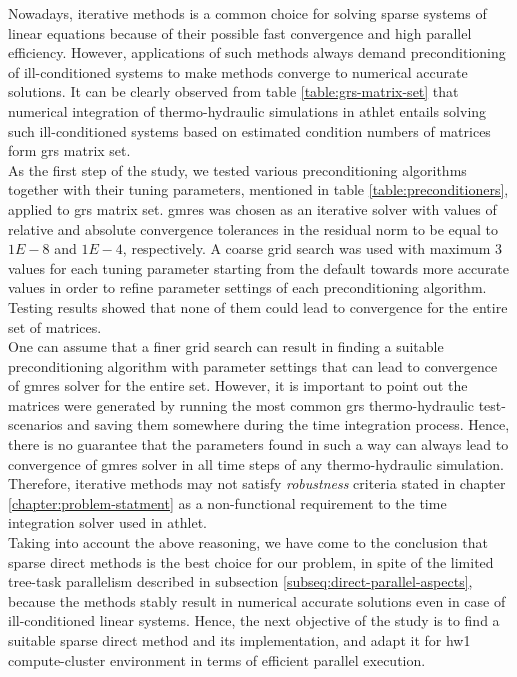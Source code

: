 \label{subseq:hybrid-method-description}

Nowadays, iterative methods is a common choice for solving sparse systems of linear equations because of their possible fast convergence and high parallel efficiency. However,  applications of such methods always demand preconditioning of ill-conditioned systems to make methods converge to numerical accurate solutions. It can be clearly observed from table \ref{table:grs-matrix-set} that numerical integration of thermo-hydraulic simulations in \acrshort{athlet} entails solving such ill-conditioned systems  based on estimated condition numbers of matrices form \acrshort{grs} matrix set.\\


As the first step of the study, we tested various preconditioning algorithms together with their tuning parameters, mentioned in table \ref{table:preconditioners}, applied to \acrshort{grs} matrix set. \acrshort{gmres} was chosen as an iterative solver with values of relative and absolute convergence tolerances in the residual norm to be equal to $1E-8$ and $1E-4$, respectively. A coarse grid search was used with maximum 3 values for each tuning parameter starting from the default towards more accurate values in order to refine parameter settings of each preconditioning algorithm. Testing results showed that none of them could lead to convergence for the entire set of matrices.\\


One can assume that a finer grid search can result in finding a suitable preconditioning algorithm with parameter  settings that can lead to convergence of \acrshort{gmres} solver for the entire set. However, it is important to point out the matrices were generated by running the most common \acrshort{grs} thermo-hydraulic test-scenarios and saving them somewhere during the time integration process. Hence, there is no guarantee that the parameters found in such a way can always lead to convergence of \acrshort{gmres} solver in all time steps of any thermo-hydraulic simulation. Therefore, iterative methods may not satisfy \textit{robustness} criteria stated in chapter \ref{chapter:problem-statment} as a non-functional requirement to the time integration solver used in \acrshort{athlet}.\\


Taking into account the above reasoning, we have come to the conclusion that sparse direct methods is the best choice for our problem, in spite of the limited tree-task parallelism described in subsection \ref{subseq:direct-parallel-aspects}, because the methods stably result in numerical accurate solutions even in case of ill-conditioned linear systems. Hence, the next objective of the study is to find a suitable sparse direct method and its implementation, and adapt it for \gls{hw1} compute-cluster environment in terms of efficient parallel execution. \\
